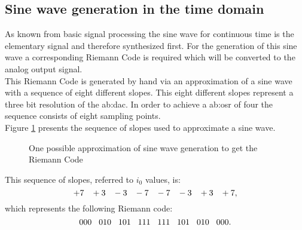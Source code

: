 \subsection{Sine wave generation in the time domain}
As known from basic signal processing 
 the sine wave for continuous time is the elementary signal and therefore synthesized first. 
For the generation of this sine wave a corresponding Riemann Code is required which will be converted to the analog output signal.\\
This Riemann Code is generated by hand via an approximation of a sine wave with a sequence of eight different slopes.
This eight different slopes represent a three bit resolution of the \gls{ab:dac}.
In order to achieve a \gls{ab:osr} of four the sequence consists of eight sampling points.\\
Figure \ref{fig:RiemannCodeGenerationSineWave} presents the sequence of slopes used to approximate a sine wave. 




\begin{figure}[htb!]
   \centering 
   
   \caption{One possible approximation of sine wave generation to get the Riemann Code}
   \label{fig:RiemannCodeGenerationSineWave}
\end{figure}


This sequence of slopes, referred to $i_0$ values, is:
\begin{equation}
 +7\hspace{.3cm} +3\hspace{.3cm} -3\hspace{.3cm} -7\hspace{.3cm} -7\hspace{.3cm} -3\hspace{.3cm} +3\hspace{.3cm} +7,
 \end{equation} which represents the following Riemann code:
\begin{equation}
000\hspace{.3cm} 010\hspace{.3cm} 101\hspace{.3cm} 111\hspace{.3cm} 111\hspace{.3cm} 101\hspace{.3cm} 010\hspace{.3cm} 000.
\end{equation}
\label{eq:RiemannCodeSineWave} 
   
